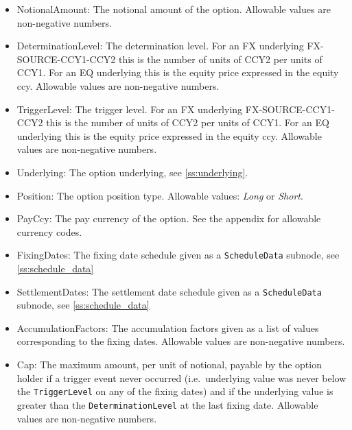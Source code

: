 \begin{itemize}
\item NotionalAmount: The notional amount of the option. Allowable values are non-negative numbers.
\item DeterminationLevel: The determination level. For an FX underlying FX-SOURCE-CCY1-CCY2 this is the number of units
  of CCY2 per units of CCY1. For an EQ underlying this is the equity price expressed in the equity ccy.  Allowable
  values are non-negative numbers.
\item TriggerLevel: The trigger level. For an FX underlying FX-SOURCE-CCY1-CCY2 this is the number of units of CCY2 per
  units of CCY1. For an EQ underlying this is the equity price expressed in the equity ccy.  Allowable values are
  non-negative numbers.
\item Underlying: The option underlying, see \ref{ss:underlying}.
\item Position: The option position type. Allowable values: {\em Long} or {\em Short}.
\item PayCcy: The pay currency of the option. See the appendix for allowable currency codes.
\item FixingDates: The fixing date schedule given as a \verb+ScheduleData+ subnode, see \ref{ss:schedule_data}
\item SettlementDates: The settlement date schedule given as a \verb+ScheduleData+ subnode, see \ref{ss:schedule_data}
\item AccumulationFactors: The accumulation factors given as a list of values corresponding to the fixing
  dates. Allowable values are non-negative numbers.
\item Cap: The maximum amount, per unit of notional, payable by the option holder if a trigger event never occurred
(i.e.\ underlying value was never below the \verb+TriggerLevel+ on any of the fixing dates) and if the underlying value
is greater than the \verb+DeterminationLevel+ at the last fixing date. Allowable values are non-negative numbers.
\end{itemize}
